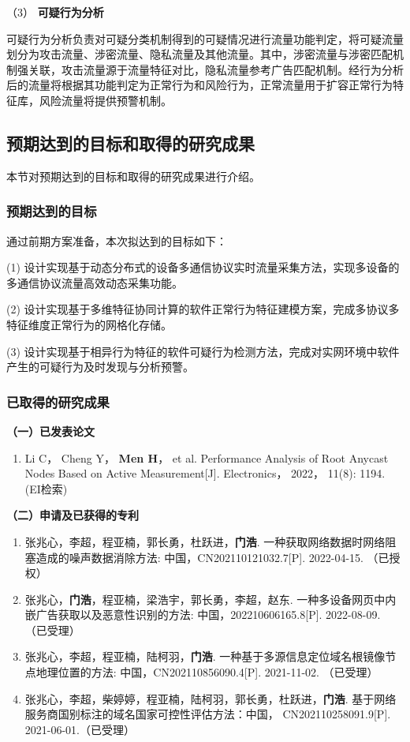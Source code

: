 （3） \textbf{可疑行为分析}\quad

可疑行为分析负责对可疑分类机制得到的可疑情况进行流量功能判定，将可疑流量划分为攻击流量、涉密流量、隐私流量及其他流量。其中，涉密流量与涉密匹配机制强关联，攻击流量源于流量特征对比，隐私流量参考广告匹配机制。经行为分析后的流量将根据其功能判定为正常行为和风险行为，正常流量用于扩容正常行为特征库，风险流量将提供预警机制。

\subsection{预期达到的目标和取得的研究成果}
本节对预期达到的目标和取得的研究成果进行介绍。
\subsubsection{预期达到的目标}

通过前期方案准备，本次拟达到的目标如下：

(1) 设计实现基于动态分布式的设备多通信协议实时流量采集方法，实现多设备的多通信协议流量高效动态采集功能。

(2) 设计实现基于多维特征协同计算的软件正常行为特征建模方案，完成多协议多特征维度正常行为的网格化存储。

(3) 设计实现基于相异行为特征的软件可疑行为检测方法，完成对实网环境中软件产生的可疑行为及时发现与分析预警。

\subsubsection{已取得的研究成果}

	\noindent\textbf{（一）已发表论文}
	\begin{enumerate}
	\item Li C， Cheng Y， \textbf{Men H}， et al. Performance Analysis of Root Anycast Nodes Based on Active Measurement[J]. Electronics， 2022， 11(8): 1194. \quad (EI检索)
\end{enumerate}
\noindent\textbf{（二）申请及已获得的专利}
\begin{enumerate}
\item 张兆心，李超，程亚楠，郭长勇，杜跃进，\textbf{门浩}. 一种获取网络数据时网络阻塞造成的噪声数据消除方法: 中国，CN202110121032.7[P]. 2022-04-15. （已授权）
\item 张兆心，\textbf{门浩}，程亚楠，梁浩宇，郭长勇，李超，赵东. 一种多设备网页中内嵌广告获取以及恶意性识别的方法: 中国，202210606165.8[P]. 2022-08-09. （已受理）
\item 张兆心，李超，程亚楠，陆柯羽，\textbf{门浩}. 一种基于多源信息定位域名根镜像节点地理位置的方法: 中国，CN202110856090.4[P]. 2021-11-02. （已受理）
\item 张兆心，李超，柴婷婷，程亚楠，陆柯羽，郭长勇，杜跃进，\textbf{门浩}. 基于网络服务商国别标注的域名国家可控性评估方法：中国， CN202110258091.9[P]. 2021-06-01.（已受理）
\end{enumerate}

